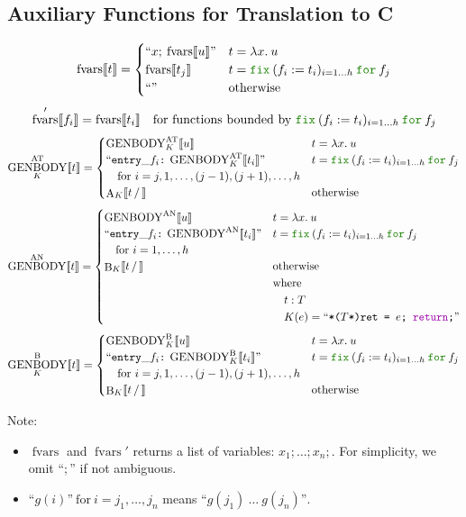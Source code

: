 \documentclass[a4paper,fleqn]{article}
\newcommand{\kwfix}{\mbox{\color{mygreen}\ttfamily fix}}
\newcommand{\kwfor}{\mbox{\color{mygreen}\ttfamily for}}
\newcommand{\lam}[2]{\lambda #1.\:#2}
\newcommand{\fix}[4]{\kwfix\:(#1 := #2)_{#3}\:\kwfor\:#4}
\newcommand{\BRA}[1]{\llbracket #1 \rrbracket}
\DeclareMathOperator{\genbody}{GENBODY}
\newcommand{\genbodyat}[2]{\genbody^\mathrm{AT}_{#1}\BRA{#2}}
\newcommand{\genbodyan}[1]{\genbody^\mathrm{AN}\BRA{#1}}
\newcommand{\genbodyb}[2]{\genbody^\mathrm{B}_{#1}\BRA{#2}}
\newcommand{\dq}[1]{\text{``}#1\text{''}}
\newcommand{\ttcolon}{\texttt{:}}
\newcommand{\kwCreturn}{\mbox{\color{myviolet}\ttfamily return}}
\DeclareMathOperator{\fvarsop}{fvars}
\newcommand{\fvars}[1]{\fvarsop\BRA{#1}}
\newcommand{\fvarsd}[1]{\fvarsop'\BRA{#1}}
\DeclareMathOperator{\Aop}{A}
\DeclareMathOperator{\Bop}{B}
\newcommand{\A}[3]{\Aop_{#1}\BRA{#2\,/\,#3}}
\newcommand{\B}[3]{\Bop_{#1}\BRA{#2\,/\,#3}}
\begin{document}
\subsection{Auxiliary Functions for Translation to C}\label{sec:aux-function}
\raggedright
\[
  \fvars{t} =
  \begin{cases}
    \dq{x;\:\fvars{u}} & t = \lam{x}{u} \\
    \fvars{t_j}       & t = \fix{f_i}{t_i}{i=1\ldots h}{f_j} \\
    \dq{}             & \text{otherwise}
  \end{cases}
\]
\[
  \fvarsd{f_i} = \fvars{t_i} \quad \text{for functions bounded by $\fix{f_i}{t_i}{i=1\ldots h}{f_j}$}
\]
\[
  \genbodyat{K}{t} =
  \begin{cases}
    \genbodyat{K}{u}                            & t = \lam{x}{u} \\
    \dq{\mathtt{entry\_}f_i\ttcolon\:\genbodyat{K}{t_i}} & t = \fix{f_i}{t_i}{i=1\ldots h}{f_j} \\
    \quad \text{for}~i=j, 1,\dotsc, (j-1), (j+1),\dotsc, h \\
    \A{K}{t}{}                            & \text{otherwise}
  \end{cases}
\]
\[
  \genbodyan{t} =
  \begin{cases}
    \genbodyan{u}                            & t = \lam{x}{u} \\
    \dq{\mathtt{entry\_}f_i\ttcolon\:\genbodyan{t_i}} & t = \fix{f_i}{t_i}{i=1\ldots h}{f_j} \\
    \quad \text{for}~i=1,\dotsc, h \\
    \B{K}{t}{}                            & \begin{aligned}[t]
                                            & \text{otherwise} \\
                                            & \text{where} \\
                                            & \quad t:T \\
                                            & \quad K(e) = \dq{\texttt{*($T$*)ret = $e$; \kwCreturn;}}
                                            \end{aligned}
  \end{cases}
\]
\[
  \genbodyb{K}{t} =
  \begin{cases}
    \genbodyb{K}{u}                            & t = \lam{x}{u} \\
    \dq{\mathtt{entry\_}f_i\ttcolon\:\genbodyb{K}{t_i}} & t = \fix{f_i}{t_i}{i=1\ldots h}{f_j} \\
    \quad \text{for}~i=j, 1,\dotsc, (j-1), (j+1),\dotsc, h \\
    \B{K}{t}{}                            & \text{otherwise}
  \end{cases}
\]
{\small Note:
\begin{itemize}
  \item $\fvarsop$ and $\fvarsop'$ returns a list of variables: $x_1;\ldots;x_n;$.  For simplicity, we omit ``$;$'' if not ambiguous.
  \item $\dq{g(i)}~\text{for}~i=j_1,\dotsc,j_n$ means $\dq{g(j_1)\:\ldots\:g(j_n)}$.
\end{itemize}}
\end{document}
